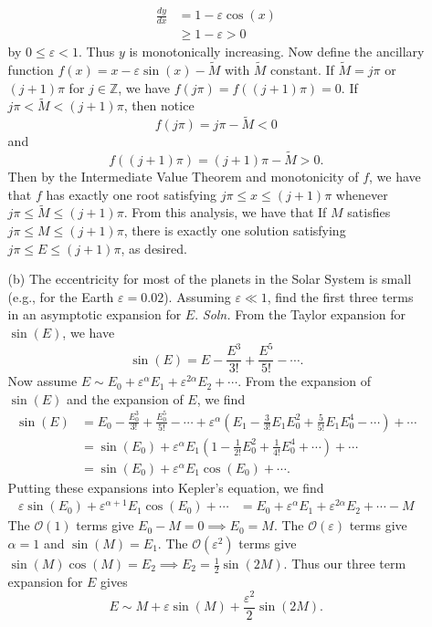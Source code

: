 \documentclass{article}
\begin{document}
\begin{itemize}
\begin{itemize}
        \begin{align*}
            \frac{dy}{dx} &= 1 - \varepsilon\cos(x)\\
            &\geq 1 - \varepsilon > 0
        \end{align*}
        by $0 \leq \varepsilon < 1$. Thus $y$ is monotonically increasing. Now define the ancillary function $f(x) = x - \varepsilon \sin(x) - \tilde{M}$ with $\tilde{M}$ constant. If $\tilde{M} = j\pi $ or $(j+1)\pi$ for $j \in \mathbb{Z}$, we have $f(j\pi) = f((j+1)\pi) = 0$. If $j\pi < \tilde{M} < (j+1)\pi$, then notice 
        \[f(j\pi) = j\pi - \tilde{M} < 0\]
        and 
        \[f((j+1)\pi) = (j+1)\pi - \tilde{M} > 0.\]
        Then by the Intermediate Value Theorem and monotonicity of $f$, we have that $f$ has exactly one root satisfying $j\pi \leq x \leq (j+1)\pi$ whenever $j\pi \leq \tilde{M} \leq (j+1)\pi$. From this analysis, we have that If $M$ satisfies $j\pi \leq M \leq (j+1)\pi$, there is exactly one solution satisfying $j\pi \leq E \leq (j+1)\pi$, as desired.
        \newline\newline

        \item[(b)] The eccentricity for most of the planets in the Solar System is small (e.g., for the Earth $\varepsilon =  0.02$). Assuming $\varepsilon \ll 1$, find the first three terms in an asymptotic expansion for $E$.
        \newline\newline
        \textit{Soln.} From the Taylor expansion for $\sin(E)$, we have
        \[\sin(E) = E - \frac{E^3}{3!} + \frac{E^5}{5!} - \cdots.\]
        Now assume $E \sim E_0 + \varepsilon^{\alpha}E_1 + \varepsilon^{2\alpha}E_2 + \cdots$. From the expansion of $\sin(E)$ and the expansion of $E$, we find
        \begin{align*}
            \sin(E) &= E_0 - \frac{E_0^3}{3!} + \frac{E_0^5}{5!} - \cdots + \varepsilon^{\alpha}\left(E_1 - \frac{3}{3!}E_1E_0^2 + \frac{5}{5!}E_1E_0^4 - \cdots\right) + \cdots\\
            &= \sin(E_0) + \varepsilon^{\alpha}E_1\left(1 - \frac{1}{2!}E_0^2 + \frac{1}{4!}E_0^4 + \cdots\right) + \cdots\\
            &= \sin(E_0) + \varepsilon^{\alpha}E_1\cos(E_0) + \cdots.
        \end{align*}
        Putting these expansions into Kepler's equation, we find
        \begin{align*}
            \varepsilon\sin(E_0) + \varepsilon^{\alpha + 1}E_1\cos(E_0) + \cdots &= E_0 + \varepsilon^{\alpha}E_1 + \varepsilon^{2\alpha}E_2 + \cdots - M
        \end{align*}
        The $\mathcal{O}(1)$ terms give $E_0 - M = 0 \implies E_0 = M$. The $\mathcal{O}(\varepsilon)$ terms give $\alpha = 1$ and $\sin(M) = E_1$. The $\mathcal{O}(\varepsilon^2)$ terms give $\sin(M)\cos(M) = E_2 \implies E_2 = \frac{1}{2}\sin(2M)$. Thus our three term expansion for $E$ gives
        \[E \sim M + \varepsilon \sin(M) + \frac{\varepsilon^2}{2}\sin(2M).\]
        \vspace{0.5cm}


\end{itemize}
\end{itemize}
\end{document}
